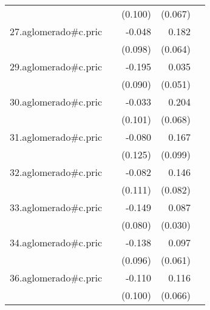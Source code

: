 {\begin{longtable}{l*{4}{D{.}{.}{-1}}}
            &                     &     (0.100)         &     (0.067)         &                     \\
\addlinespace
27.aglomerado#c.pric&                     &      -0.048         &       0.182\sym{**} &                     \\
            &                     &     (0.098)         &     (0.064)         &                     \\
\addlinespace
29.aglomerado#c.pric&                     &      -0.195\sym{*}  &       0.035         &                     \\
            &                     &     (0.090)         &     (0.051)         &                     \\
\addlinespace
30.aglomerado#c.pric&                     &      -0.033         &       0.204\sym{**} &                     \\
            &                     &     (0.101)         &     (0.068)         &                     \\
\addlinespace
31.aglomerado#c.pric&                     &      -0.080         &       0.167         &                     \\
            &                     &     (0.125)         &     (0.099)         &                     \\
\addlinespace
32.aglomerado#c.pric&                     &      -0.082         &       0.146         &                     \\
            &                     &     (0.111)         &     (0.082)         &                     \\
\addlinespace
33.aglomerado#c.pric&                     &      -0.149         &       0.087\sym{**} &                     \\
            &                     &     (0.080)         &     (0.030)         &                     \\
\addlinespace
34.aglomerado#c.pric&                     &      -0.138         &       0.097         &                     \\
            &                     &     (0.096)         &     (0.061)         &                     \\
\addlinespace
36.aglomerado#c.pric&                     &      -0.110         &       0.116         &                     \\
            &                     &     (0.100)         &     (0.066)         &                     \\

\end{longtable}}
